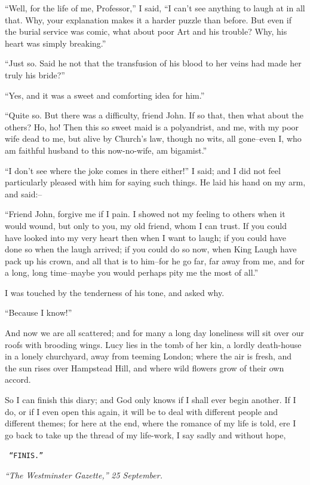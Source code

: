 \documentclass[12pt,openright]{book}
\begin{document}
“Well, for the life of me, Professor,” I said, “I can’t see anything to laugh at in all that. Why, your explanation makes it a harder puzzle than before. But even if the burial service was comic, what about poor Art and his trouble? Why, his heart was simply breaking.”

“Just so. Said he not that the transfusion of his blood to her veins had made her truly his bride?”

“Yes, and it was a sweet and comforting idea for him.”

“Quite so. But there was a difficulty, friend John. If so that, then what about the others? Ho, ho! Then this so sweet maid is a polyandrist, and me, with my poor wife dead to me, but alive by Church’s law, though no wits, all gone–even I, who am faithful husband to this now-no-wife, am bigamist.”

“I don’t see where the joke comes in there either!” I said; and I did not feel particularly pleased with him for saying such things. He laid his hand on my arm, and said:–

“Friend John, forgive me if I pain. I showed not my feeling to others when it would wound, but only to you, my old friend, whom I can trust. If you could have looked into my very heart then when I want to laugh; if you could have done so when the laugh arrived; if you could do so now, when King Laugh have pack up his crown, and all that is to him–for he go far, far away from me, and for a long, long time–maybe you would perhaps pity me the most of all.”

I was touched by the tenderness of his tone, and asked why.

“Because I know!”

And now we are all scattered; and for many a long day loneliness will sit over our roofs with brooding wings. Lucy lies in the tomb of her kin, a lordly death-house in a lonely churchyard, away from teeming London; where the air is fresh, and the sun rises over Hampstead Hill, and where wild flowers grow of their own accord.

So I can finish this diary; and God only knows if I shall ever begin another. If I do, or if I even open this again, it will be to deal with different people and different themes; for here at the end, where the romance of my life is told, ere I go back to take up the thread of my life-work, I say sadly and without hope,

\texttt{                    “FINIS.”}

\textit{“}\textit{The Westminster Gazette,}\textit{”}\textit{ }\textit{25 September.}
\end{document}
